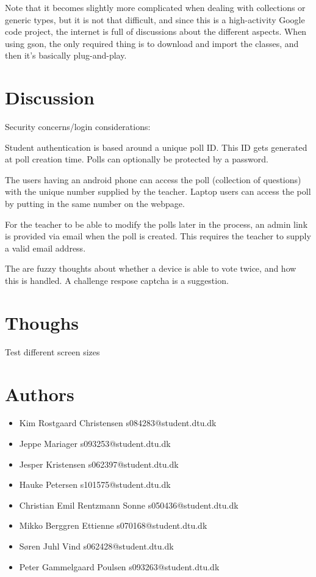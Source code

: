 \documentclass{acm_proc_article-sp}
\begin{document}
Note that it becomes slightly more complicated when dealing with collections or generic types, but it is not that difficult, and since this is a high-activity Google code project, the internet is full of discussions about the different aspects. When using gson, the only required thing is to download and import the classes, and then it's basically plug-and-play.

\balancecolumns
 
\section{Discussion}
 
Security concerns/login considerations:

Student authentication is based around a unique poll ID. This ID gets generated at poll creation time. Polls can optionally be protected by a password.

The users having an android phone can access the poll (collection of questions) with the unique number supplied by the teacher. Laptop users can access the poll by putting in the same number on the webpage.

For the teacher to be able to modify the polls later in the process, an admin link is provided via email when the poll is created. This requires the teacher to supply a valid email address.

The are fuzzy thoughts about whether a device is able to vote twice, and how this is handled. A challenge respose captcha is a suggestion.


\appendix

\section{Thoughs}
Test different screen sizes

\section{Authors}
\begin{itemize}
\item Kim Rostgaard Christensen  s084283@student.dtu.dk
\item Jeppe Mariager s093253@student.dtu.dk
\item Jesper Kristensen s062397@student.dtu.dk
\item Hauke Petersen s101575@student.dtu.dk
\item Christian Emil Rentzmann Sonne s050436@student.dtu.dk
\item Mikko Berggren Ettienne s070168@student.dtu.dk
\item Søren Juhl Vind s062428@student.dtu.dk
\item Peter Gammelgaard Poulsen s093263@student.dtu.dk
\end{itemize}
\end{document}

